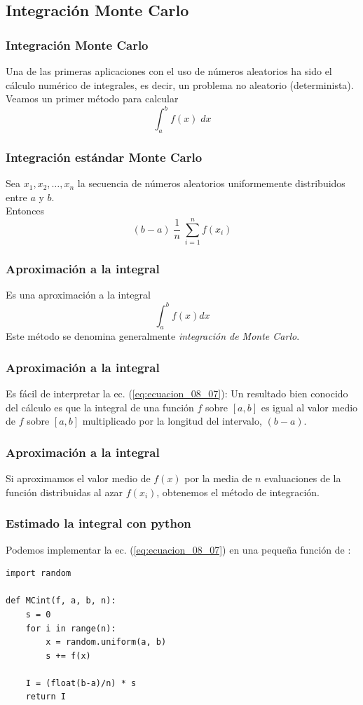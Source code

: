 \subsection{Integración Monte Carlo}
\begin{frame}
\frametitle{Integración Monte Carlo}
Una de las primeras aplicaciones con el uso de números aleatorios ha sido el cálculo numérico de integrales, es decir, un problema no aleatorio (determinista).
\\
\bigskip
Veamos un primer método para calcular
\[ \int_{a}^{b} f(x) \; d x \]
\end{frame}
\begin{frame}
\frametitle{Integración estándar Monte Carlo}
Sea $x_{1}, x_{2}, \ldots, x_{n}$ la secuencia de números aleatorios uniformemente distribuidos entre $a$ y $b$.
\\
\bigskip
Entonces
\begin{equation}
 (b - a) \; \dfrac{1}{n} \; \sum_{i=1}^{n} f(x_{i})
\label{eq:ecuacion_08_07}
\end{equation}
\end{frame}
\begin{frame}
\frametitle{Aproximación a la integral}
Es una aproximación a la integral 
\[ \int_{a}^{b} f(x) dx \]
Este método se denomina generalmente \emph{integración de Monte Carlo}.
\end{frame}
\begin{frame}
\frametitle{Aproximación a la integral}
Es fácil de interpretar la ec. (\ref{eq:ecuacion_08_07}): Un resultado bien conocido del cálculo es que la integral de una función $f$ sobre $[a, b]$ es igual al valor medio de $f$ sobre $[a, b]$ multiplicado por la longitud del intervalo, $(b - a)$.
\end{frame}
\begin{frame}
\frametitle{Aproximación a la integral}
Si aproximamos el valor medio de $f(x)$ por la media de $n$ evaluaciones de la función distribuidas al azar $f(x_{i})$, obtenemos el método de integración.
\end{frame}
\begin{frame}
\frametitle{Estimado la integral con python}
Podemos implementar la ec. (\ref{eq:ecuacion_08_07}) en una pequeña función de \python:
\begin{lstlisting}[caption=Función para aproximar la integral, style=FormattedNumber, basicstyle=\linespread{1.1}\ttfamily=\small, columns=fullflexible]
import random

def MCint(f, a, b, n):
    s = 0
    for i in range(n):
        x = random.uniform(a, b)
        s += f(x)
        
    I = (float(b-a)/n) * s
    return I
\end{lstlisting}
\end{frame}

